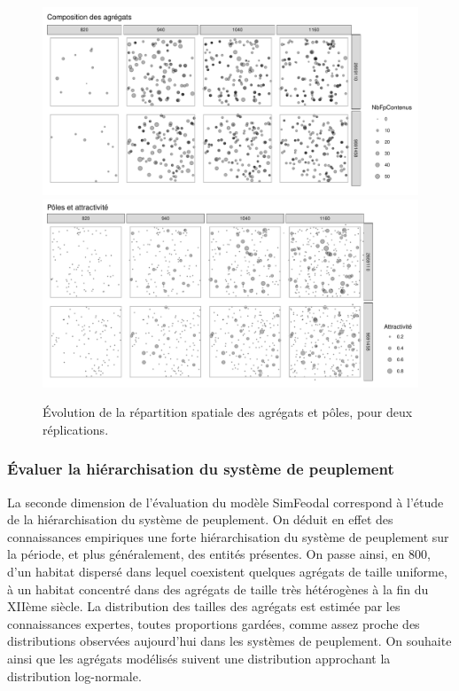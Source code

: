 \begin{figure}[H]
	\captionsetup{width=\linewidth}
	\includegraphics[width=\linewidth]{img/resultats/v0_cartes_agregats.pdf}
	\includegraphics[width=\linewidth]{img/resultats/v0_cartes_poles.pdf}
	\caption{Évolution de la répartition spatiale des agrégats et pôles, pour deux réplications.} 
	\label{fig:cartes-agregats-v0} 
\end{figure}

\subsubsection{Évaluer la hiérarchisation du système de peuplement}

La seconde dimension de l'évaluation du modèle SimFeodal correspond à l'étude de la hiérarchisation du système de peuplement.
On déduit en effet des connaissances empiriques une forte hiérarchisation du système de peuplement sur la période, et plus généralement, des entités présentes.
On passe ainsi, en 800, d'un habitat dispersé dans lequel coexistent quelques agrégats de taille uniforme, à un habitat concentré dans des agrégats de taille très hétérogènes à la fin du XIIème siècle.
La distribution des tailles des agrégats est estimée par les connaissances expertes, toutes proportions gardées, comme assez proche des distributions observées aujourd'hui dans les systèmes de peuplement.
On souhaite ainsi que les agrégats modélisés suivent une distribution approchant la distribution log-normale.

